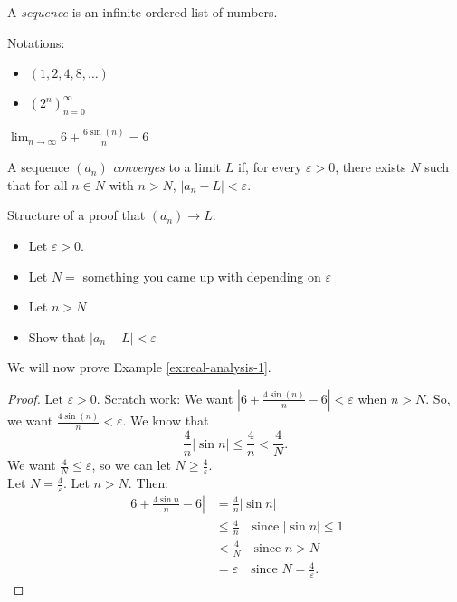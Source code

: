 \begin{definition}[Sequences]
A \textit{sequence} is an infinite ordered list of numbers.
\end{definition}
Notations:
\begin{itemize}
    \item $(1,2,4,8,\dots)$
    \item $(2^n)^\infty_{n=0}$
\end{itemize}

\begin{example}
\label{ex:real-analysis-1}
$\lim_{n\to \infty}6+\frac{6\sin(n)}{n}=6$
\end{example}

\begin{definition}
A sequence $(a_n)$ \textit{converges} to a limit $L$ if, for every $\varepsilon>0$, there exists $N$ such that for all $n \in N$ with $n > N$, $|a_n - L| < \varepsilon$.
\end{definition}
\begin{note} Structure of a proof that $(a_n) \rightarrow L$:
\begin{itemize}
    \item Let $\varepsilon >0$.
    \item Let $N=$ something you came up with depending on $\varepsilon$
    \item Let $n>N$
    \item Show that $|a_n-L|<\varepsilon$
\end{itemize}
\end{note}

We will now prove Example \ref{ex:real-analysis-1}.

\begin{proof}
Let $\varepsilon > 0$. 
\newline
{
\color{blue}
Scratch work: We want $|6+\frac{4\sin(n)}{n}-6|<\varepsilon
$ when $n>N$. So, we want $\frac{4\sin(n)}{n}<\varepsilon$. We know that
\[
\frac{4}{n} |\sin n | \le \frac 4 n < \frac 4 N.
\]
We want $\frac 4 N \le \varepsilon$, so we can let $N \ge \frac 4 \varepsilon$.
}
\\

Let $N = \frac 4 \varepsilon$. Let $n > N$. Then:
\begin{align*}
    | 6 + \frac{4\sin n}{n} - 6 | &= \frac{4}{n}|\sin n| \\
    &\le \frac 4 n \quad \text{since }|\sin n| \le 1 \\
    &< \frac 4 N \quad \text{since } n > N \\
    &=\varepsilon \quad \text{since }N = \frac 4 \varepsilon.
\end{align*}
\end{proof}

